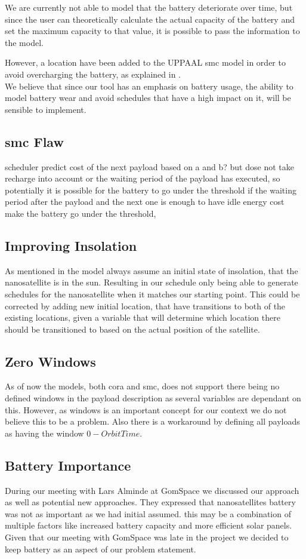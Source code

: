 We are currently not able to model that the battery deteriorate over time, but since the user can theoretically calculate the actual capacity of the battery and set the maximum capacity to that value, it is possible to pass the information to the model.

However, a location have been added to the UPPAAL \gls{smc} model in order to avoid overcharging the battery, as explained in .\\

We believe that since our tool has an emphasis on battery usage, the ability to model battery wear and avoid schedules that have a high impact on it, will be sensible to implement. 

\subsection*{\gls{smc} Flaw}
scheduler predict cost of the next payload based on a and b? but dose not take recharge into account or the waiting period of the payload has executed, so potentially it is possible for the battery to go under the threshold if the waiting period after the payload and the next one is enough to have idle energy cost make the battery go under the threshold,  

\subsection*{Improving Insolation}
As mentioned in  the model always assume an initial state of insolation, that the nanosatellite is in the sun. Resulting in our schedule only being able to generate schedules for the nanosatellite when it matches our starting point.
This could be corrected by adding new initial location, that have transitions to both of the existing locations, given a variable that will determine which location there should be transitioned to based on the actual position of the satellite.


\subsection*{Zero Windows}
As of now the models, both \gls{cora} and \gls{smc}, does not support there being no defined windows in the payload description as several variables are dependant on this. However, as windows is an important concept for our context we do not believe this to be a problem. Also there is a workaround by defining all payloads as having the window $0-OrbitTime$.

\subsection*{Battery Importance}
During our meeting with Lars Alminde at GomSpace we discussed our approach as well as potential new approaches. They expressed that nanosatellites battery was not as important as we had initial assumed\cite{gom_space_conversation}. this may be a combination of multiple factors like increased battery capacity and more efficient solar panels. Given that our meeting with GomSpace was late in the project we decided to keep battery as an aspect of our problem statement.


